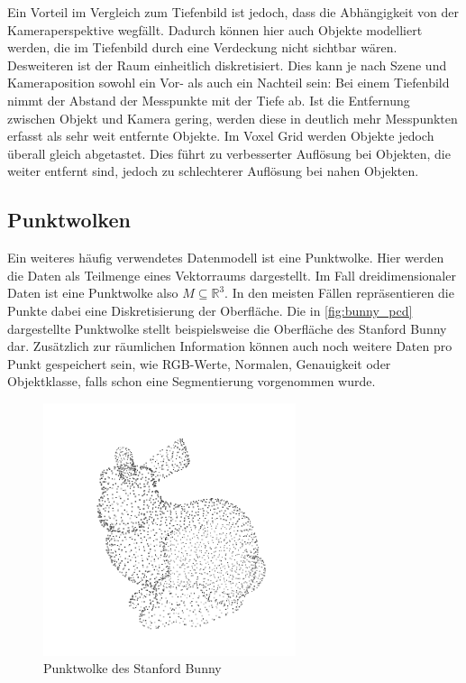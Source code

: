Ein Vorteil im Vergleich zum Tiefenbild ist jedoch, dass die Abhängigkeit von der Kameraperspektive wegfällt.
Dadurch können hier auch Objekte modelliert werden, die im Tiefenbild durch eine Verdeckung nicht sichtbar wären.
Desweiteren ist der Raum einheitlich diskretisiert.
Dies kann je nach Szene und Kameraposition sowohl ein Vor- als auch ein Nachteil sein:
Bei einem Tiefenbild nimmt der Abstand der Messpunkte mit der Tiefe ab.
Ist die Entfernung zwischen Objekt und Kamera gering, werden diese in deutlich mehr Messpunkten erfasst als sehr weit entfernte Objekte.
Im Voxel Grid werden Objekte jedoch überall gleich abgetastet.
Dies führt zu verbesserter Auflösung bei Objekten, die weiter entfernt sind, jedoch zu schlechterer Auflösung bei nahen Objekten.


\subsection{Punktwolken}
\label{subsec:punktwolken}

Ein weiteres häufig verwendetes Datenmodell ist eine Punktwolke.
Hier werden die Daten als Teilmenge eines Vektorraums dargestellt.
Im Fall dreidimensionaler Daten ist eine Punktwolke also $M \subseteq \mathbb{R}^3$.
In den meisten Fällen repräsentieren die Punkte dabei eine Diskretisierung der Oberfläche.
Die in \autoref{fig:bunny_pcd} dargestellte Punktwolke stellt beispielsweise die Oberfläche des Stanford Bunny \cite{stanfordbunny} dar.
Zusätzlich zur räumlichen Information können auch noch weitere Daten pro Punkt gespeichert sein, wie RGB-Werte, Normalen, Genauigkeit oder Objektklasse, falls schon eine Segmentierung vorgenommen wurde.

\begin{figure}[H]
	\centering
	\includegraphics[width=0.66\textwidth, frame]{images/bunny_pcd.png}
	\caption{Punktwolke des Stanford Bunny \cite{stanfordbunny}}
	\label{fig:bunny_pcd}
\end{figure}

